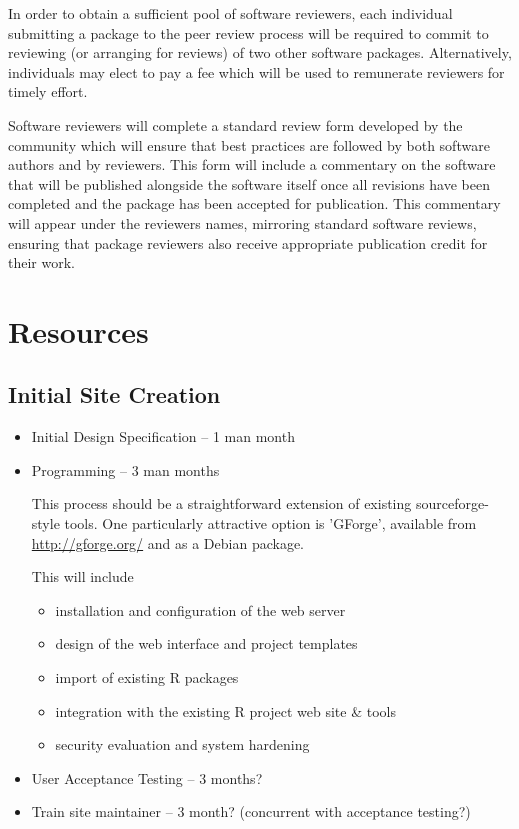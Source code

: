 \documentclass[12pt]{article}
\begin{document}
In order to obtain a sufficient pool of software reviewers, each
individual submitting a package to the peer review process will be
required to commit to reviewing (or arranging for reviews) of two
other software packages.  Alternatively, individuals may elect to pay
a fee which will be used to remunerate reviewers for timely effort.

Software reviewers will complete a standard review form developed by
the community which will ensure that best practices are followed by
both software authors and by reviewers.  This form will include a
commentary on the software that will be published alongside the
software itself once all revisions have been completed and the
package has been accepted for publication.  This commentary will
appear under the reviewers names, mirroring standard software
reviews, ensuring that package reviewers also receive appropriate
publication credit for their work.

\section{Resources}

\subsection{Initial Site Creation}

\begin{itemize}
\item Initial Design Specification -- 1 man month

\item Programming -- 3 man months

  This process should be a straightforward extension of existing
  sourceforge-style tools.  One particularly attractive option is
  'GForge', available from \url{http://gforge.org/} and as a Debian package.

  This will include
  \begin{itemize}
  \item installation and configuration of the web server
  \item design of the web interface and project templates
  \item import of existing R packages
  \item integration with the existing R project web site \& tools
  \item security evaluation and system hardening
  \end{itemize}

\item User Acceptance Testing -- 3 months?

\item Train site maintainer -- 3 month?  (concurrent with acceptance testing?)

\end{itemize}
\end{document}
